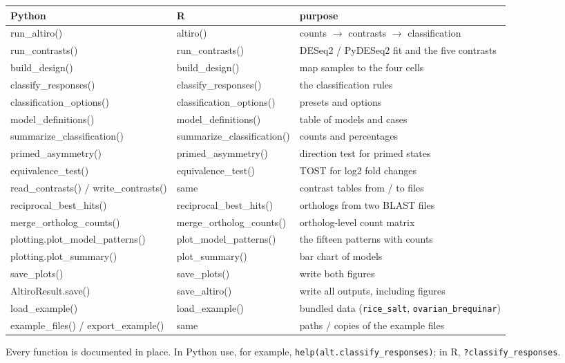 \documentclass[11pt,a4paper]{article}
\newcommand{\code}[1]{\texttt{\color{navy!85!black}#1}}
\begin{document}
\begin{center}
\small
\begin{tabularx}{\linewidth}{>{\ttfamily\color{grpA!85!black}}l >{\ttfamily\color{grpB!85!black}}l Y}
\toprule
\textsf{\textbf{Python}} & \textsf{\textbf{R}} & \textsf{\textbf{purpose}}\\
\midrule
run\_altiro() & altiro() & counts \(\rightarrow\) contrasts \(\rightarrow\) classification\\
run\_contrasts() & run\_contrasts() & DESeq2 / PyDESeq2 fit and the five contrasts\\
build\_design() & build\_design() & map samples to the four cells\\
classify\_responses() & classify\_responses() & the classification rules\\
classification\_options() & classification\_options() & presets and options\\
model\_definitions() & model\_definitions() & table of models and cases\\
summarize\_classification() & summarize\_classification() & counts and percentages\\
primed\_asymmetry() & primed\_asymmetry() & direction test for primed states\\
equivalence\_test() & equivalence\_test() & TOST for log2 fold changes\\
read\_contrasts() / write\_contrasts() & {\color{grpB!85!black}same} & contrast tables from / to files\\
reciprocal\_best\_hits() & reciprocal\_best\_hits() & orthologs from two BLAST files\\
merge\_ortholog\_counts() & merge\_ortholog\_counts() & ortholog-level count matrix\\
plotting.plot\_model\_patterns() & plot\_model\_patterns() & the fifteen patterns with counts\\
plotting.plot\_summary() & plot\_summary() & bar chart of models\\
save\_plots() & save\_plots() & write both figures\\
AltiroResult.save() & save\_altiro() & write all outputs, including figures\\
load\_example() & load\_example() & bundled data (\code{rice\_salt}, \code{ovarian\_brequinar})\\
example\_files() / export\_example() & {\color{grpB!85!black}same} & paths / copies of the example files\\
\bottomrule
\end{tabularx}
\end{center}
Every function is documented in place. In Python use, for example,
\code{help(alt.classify\_responses)}; in R, \code{?classify\_responses}.
\end{document}
